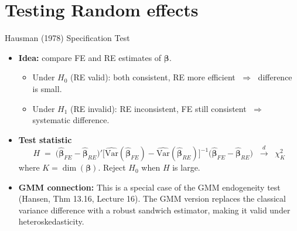 \documentclass[aspectratio=169, handout, t]{beamer}
\numberwithin{equation}{section}
\begin{document}
\section{Testing Random effects}
\begin{frame}{Hausman (1978) Specification Test}
\begin{itemize}
  \item \textbf{Idea:} compare FE and RE estimates of $\bm{\beta}$.
    \begin{itemize}
      \item Under $H_0$ (RE valid): both consistent, RE more efficient $\;\Rightarrow\;$ difference is small.
      \item Under $H_1$ (RE invalid): RE inconsistent, FE still consistent $\;\Rightarrow\;$ systematic difference.
    \end{itemize}\pause
  \item \textbf{Test statistic}
    \[
      H \;=\;
      \bigl(\hat{\bm{\beta}}_{FE}-\hat{\bm{\beta}}_{RE}\bigr)'
      \bigl[\widehat{\text{Var}}(\hat{\bm{\beta}}_{FE})
            -\widehat{\text{Var}}(\hat{\bm{\beta}}_{RE})\bigr]^{-1}
      \bigl(\hat{\bm{\beta}}_{FE}-\hat{\bm{\beta}}_{RE}\bigr)
      \;\;\xrightarrow{d}\;\;\chi^{2}_{K}
    \]
    where $K=\dim(\bm{\beta})$.  Reject $H_0$ when $H$ is large.\pause
  \item \textbf{GMM connection:} This is a special case of the GMM endogeneity test (Hansen, Thm 13.16, Lecture 16). The GMM version replaces the classical variance difference with a robust sandwich estimator, making it valid under heteroskedasticity.
\end{itemize}
\end{frame}
\end{document}
